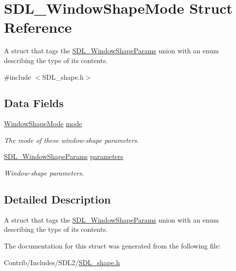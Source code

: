 \hypertarget{struct_s_d_l___window_shape_mode}{}\section{S\+D\+L\+\_\+\+Window\+Shape\+Mode Struct Reference}
\label{struct_s_d_l___window_shape_mode}


A struct that tags the \hyperlink{union_s_d_l___window_shape_params}{S\+D\+L\+\_\+\+Window\+Shape\+Params} union with an enum describing the type of its contents.  




{\ttfamily \#include $<$S\+D\+L\+\_\+shape.\+h$>$}

\subsection*{Data Fields}
\begin{DoxyCompactItemize}
\item 
\hyperlink{_s_d_l__shape_8h_aa30948f2699e316a43b740eccebe5c20}{Window\+Shape\+Mode} \hyperlink{struct_s_d_l___window_shape_mode_ab4a7dfd410934bebf80e105f6fa72b74}{mode}\hypertarget{struct_s_d_l___window_shape_mode_ab4a7dfd410934bebf80e105f6fa72b74}{}\label{struct_s_d_l___window_shape_mode_ab4a7dfd410934bebf80e105f6fa72b74}

\begin{DoxyCompactList}\small\item\em The mode of these window-\/shape parameters. \end{DoxyCompactList}\item 
\hyperlink{union_s_d_l___window_shape_params}{S\+D\+L\+\_\+\+Window\+Shape\+Params} \hyperlink{struct_s_d_l___window_shape_mode_ade9cf0ce2577f5478fb4015dc15347bb}{parameters}\hypertarget{struct_s_d_l___window_shape_mode_ade9cf0ce2577f5478fb4015dc15347bb}{}\label{struct_s_d_l___window_shape_mode_ade9cf0ce2577f5478fb4015dc15347bb}

\begin{DoxyCompactList}\small\item\em Window-\/shape parameters. \end{DoxyCompactList}\end{DoxyCompactItemize}


\subsection{Detailed Description}
A struct that tags the \hyperlink{union_s_d_l___window_shape_params}{S\+D\+L\+\_\+\+Window\+Shape\+Params} union with an enum describing the type of its contents. 

The documentation for this struct was generated from the following file\+:\begin{DoxyCompactItemize}
\item 
Contrib/\+Includes/\+S\+D\+L2/\hyperlink{_s_d_l__shape_8h}{S\+D\+L\+\_\+shape.\+h}\end{DoxyCompactItemize}
